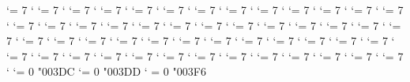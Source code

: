 \Umathcode `\Ζ = 7 \mrmfam `\Ζ %
\Umathcode `\Η = 7 \mrmfam `\Η %
\Umathcode `\Θ = 7 \mrmfam `\Θ %
\Umathcode `\Ι = 7 \mrmfam `\Ι %
\Umathcode `\Κ = 7 \mrmfam `\Κ %
\Umathcode `\Λ = 7 \mrmfam `\Λ %
\Umathcode `\Μ = 7 \mrmfam `\Μ %
\Umathcode `\Ν = 7 \mrmfam `\Ν %
\Umathcode `\Ξ = 7 \mrmfam `\Ξ %
\Umathcode `\Ο = 7 \mrmfam `\Ο %
\Umathcode `\Π = 7 \mrmfam `\Π %
\Umathcode `\Ρ = 7 \mrmfam `\Ρ %
\Umathcode `\Σ = 7 \mrmfam `\Σ %
\Umathcode `\Τ = 7 \mrmfam `\Τ %
\Umathcode `\Υ = 7 \mrmfam `\Υ %
\Umathcode `\Φ = 7 \mrmfam `\Φ %
\Umathcode `\Χ = 7 \mrmfam `\Χ %
\Umathcode `\Ψ = 7 \mrmfam `\Ψ %
\Umathcode `\Ω = 7 \mrmfam `\Ω %
\Umathcode `\α = 7 \mitfam `\α %
\Umathcode `\β = 7 \mitfam `\β %
\Umathcode `\γ = 7 \mitfam `\γ %
\Umathcode `\δ = 7 \mitfam `\δ %
\Umathcode `\ε = 7 \mitfam `\ε %
\Umathcode `\ζ = 7 \mitfam `\ζ %
\Umathcode `\η = 7 \mitfam `\η %
\Umathcode `\θ = 7 \mitfam `\θ %
\Umathcode `\ι = 7 \mitfam `\ι %
\Umathcode `\κ = 7 \mitfam `\κ %
\Umathcode `\λ = 7 \mitfam `\λ %
\Umathcode `\μ = 7 \mitfam `\μ %
\Umathcode `\ν = 7 \mitfam `\ν %
\Umathcode `\ξ = 7 \mitfam `\ξ %
\Umathcode `\ο = 7 \mitfam `\ο %
\Umathcode `\π = 7 \mitfam `\π %
\Umathcode `\ρ = 7 \mitfam `\ρ %
\Umathcode `\ς = 7 \mitfam `\ς %
\Umathcode `\σ = 7 \mitfam `\σ %
\Umathcode `\τ = 7 \mitfam `\τ %
\Umathcode `\υ = 7 \mitfam `\υ %
\Umathcode `\φ = 7 \mitfam `\φ %
\Umathcode `\χ = 7 \mitfam `\χ %
\Umathcode `\ψ = 7 \mitfam `\ψ %
\Umathcode `\ω = 7 \mitfam `\ω %
\Umathcode `\ϑ = 7 \mitfam `\ϑ %
\Umathcode `\ϕ = 7 \mitfam `\ϕ %
\Umathcode `\ϖ = 7 \mitfam `\ϖ %
\Umathcode `\ϰ = 7 \mitfam `\ϰ %
\Umathcode `\ϱ = 7 \mitfam `\ϱ %
\Umathcode `\ϴ = 7 \mrmfam `\ϴ %
\Umathcode `\ϵ = 7 \mitfam `\ϵ %
\Umathcode `\Ϝ = 0 \ordfam "003DC
\Umathcode `\ϝ = 0 \ordfam "003DD
\Umathcode `\϶ = 0 \ordfam "003F6

\let\Alpha=Α      \let\Beta=Β     \let\Gamma=Γ    \let\Delta=Δ
\let\Epsilon=Ε    \let\Zeta=Ζ     \let\Eta=Η      \let\Theta=Θ
\let\Iota=Ι       \let\Kappa=Κ    \let\Lambda=Λ   \let\Mu=Μ
\let\Nu=Ν         \let\Xi=Ξ       \let\Omicron=Ο  \let\Pi=Π
\let\Rho=Ρ        \let\Sigma=Σ    \let\Tau=Τ      \let\Upsilon=Υ
\let\Phi=Φ        \let\Chi=Χ      \let\Psi=Ψ      \let\Omega=Ω
\let\alpha=α      \let\beta=β     \let\gamma=γ    \let\delta=δ
\let\varepsilon=ε \let\zeta=ζ     \let\eta=η      \let\theta=θ
\let\iota=ι       \let\kappa=κ    \let\lambda=λ   \let\mu=μ
\let\nu=ν         \let\xi=ξ       \let\omicron=ο  \let\pi=π
\let\rho=ρ        \let\varsigma=ς \let\sigma=σ    \let\tau=τ
\let\upsilon=υ    \let\phi=φ      \let\chi=χ      \let\psi=ψ
\let\omega=ω      \let\vartheta=ϑ \let\varphi=ϕ   \let\varpi=ϖ
\let\varkappa=ϰ   \let\varrho=ϱ   \let\varTheta=ϴ \let\epsilon=ϵ
\let\partial=∂    \let\nabla=∇

